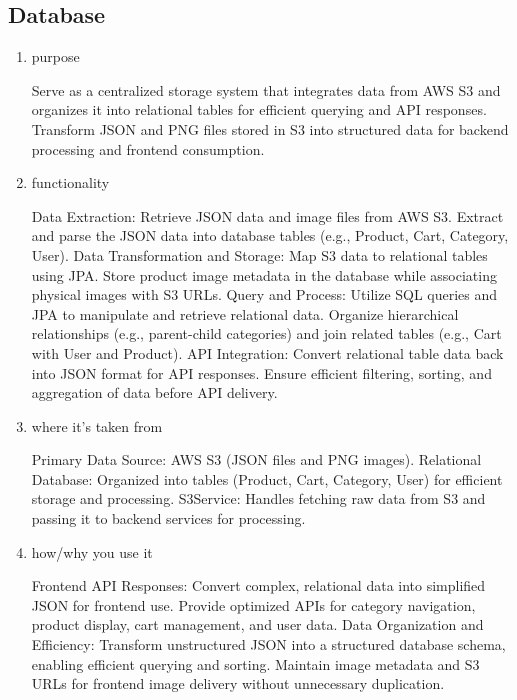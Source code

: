 \documentclass[conference]{IEEEtran}
\begin{document}
\subsection{Database}
\begin{enumerate}
\item purpose

Serve as a centralized storage system that integrates data from AWS S3 and organizes it into relational tables for efficient querying and API responses.
Transform JSON and PNG files stored in S3 into structured data for backend processing and frontend consumption.

\item functionality

Data Extraction:
Retrieve JSON data and image files from AWS S3.
Extract and parse the JSON data into database tables (e.g., Product, Cart, Category, User).\newline
Data Transformation and Storage:
Map S3 data to relational tables using JPA.
Store product image metadata in the database while associating physical images with S3 URLs.\newline
Query and Process:
Utilize SQL queries and JPA to manipulate and retrieve relational data.
Organize hierarchical relationships (e.g., parent-child categories) and join related tables (e.g., Cart with User and Product).\newline
API Integration:
Convert relational table data back into JSON format for API responses.
Ensure efficient filtering, sorting, and aggregation of data before API delivery.

\item where it's taken from

Primary Data Source: AWS S3 (JSON files and PNG images).\newline
Relational Database: Organized into tables (Product, Cart, Category, User) for efficient storage and processing.\newline
S3Service: Handles fetching raw data from S3 and passing it to backend services for processing.

\item how/why you use it

Frontend API Responses:
Convert complex, relational data into simplified JSON for frontend use.
Provide optimized APIs for category navigation, product display, cart management, and user data.\newline
Data Organization and Efficiency:
Transform unstructured JSON into a structured database schema, enabling efficient querying and sorting.
Maintain image metadata and S3 URLs for frontend image delivery without unnecessary duplication.

\end{enumerate}
\end{document}
